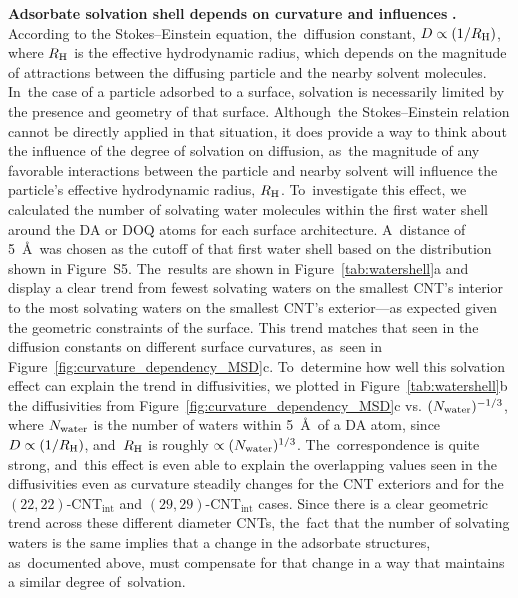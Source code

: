 \documentclass[molecules,article,accept,pdftex,moreauthors]{Definitions/mdpi}
\begin{document}
{\bf Adsorbate solvation shell depends on curvature and influences} \textbf{.} %
 According to the Stokes--Einstein equation, the~diffusion constant, $D\propto (1/R_{\rm H})$, where $R_{\rm H}$ is the effective hydrodynamic radius, which depends on the magnitude of attractions between the diffusing particle and the nearby solvent molecules. In~the case of a particle adsorbed to a surface, solvation is necessarily limited by the presence and geometry of that surface. Although~the Stokes--Einstein relation cannot be directly applied in that situation, it does provide a way to think about the influence of the degree of solvation on diffusion, as~the magnitude of any favorable interactions between the particle and nearby solvent will influence the particle's effective hydrodynamic radius, $R_{\rm H}$. To~investigate this effect, we calculated the number of solvating water molecules within the first water shell around the DA or DOQ atoms for each surface architecture. A~distance of 5~\AA\ was chosen as the cutoff of that first water shell based on the distribution shown in Figure~S5. The~results are shown in Figure~\ref{tab:watershell}a and display a clear trend from fewest solvating waters on the smallest CNT's interior to the most solvating waters on the smallest CNT's exterior---as expected given the geometric constraints of the surface. This trend matches that seen in the diffusion constants on different surface curvatures, as~seen in Figure~\ref{fig:curvature_dependency_MSD}c. To~determine how well this solvation effect can explain the trend in diffusivities, we plotted in Figure~\ref{tab:watershell}b the diffusivities from Figure~\ref{fig:curvature_dependency_MSD}c vs. $(N_{\rm water})^{-1/3}$, where $N_{\rm water}$ is the number of waters within 5~\AA\ of a DA atom, since $D\propto (1/R_{\rm H})$, and~$R_{\rm H}$ is roughly $\propto (N_{\rm water})^{1/3}$. The~correspondence is quite strong, and~this effect is even able to explain the overlapping values seen in the diffusivities even as curvature steadily changes for the CNT exteriors and for the $(22,22)$-CNT$_\mathrm{int}$ and $(29,29)$-CNT$_\mathrm{int}$ cases. Since there is a clear geometric trend across these different diameter CNTs, the~fact that the number of solvating waters is the same implies that a change in the adsorbate structures, as~documented above, must compensate for that change in a way that maintains a similar degree of~solvation.
\end{document}
